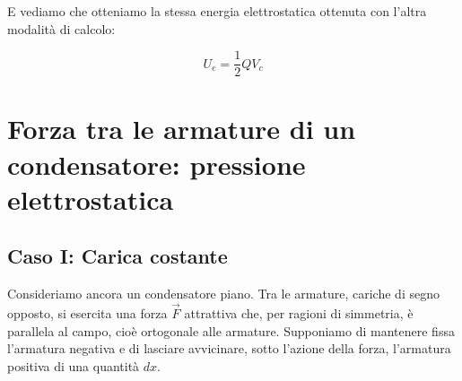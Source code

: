 E vediamo che otteniamo la stessa energia elettrostatica ottenuta con l'altra modalità di calcolo:

\[
	U_e = \frac{1}{2} Q V_c
\]

\section{Forza tra le armature di un condensatore: pressione elettrostatica}

\subsection{Caso I: Carica costante}

Consideriamo ancora un condensatore piano. Tra le armature, cariche di segno opposto, si esercita una forza $\vec{F}$ attrattiva che, per ragioni di simmetria, è parallela al campo, cioè ortogonale alle armature. Supponiamo di mantenere fissa l'armatura negativa e di lasciare avvicinare, sotto l'azione della forza, l'armatura positiva di una quantità $dx$.

